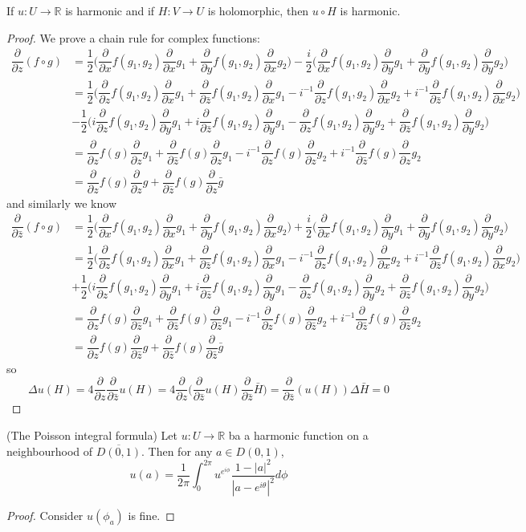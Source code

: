 \documentclass[lang=en, color=blue, ]{elegantbook}
\newcommand{\R}{\mathbb{R}}
\newcommand{\ParZ}{\dfrac{\partial}{\partial z}}
\newcommand{\ParbZ}{\dfrac{\partial}{\partial \bar{z}}}
\newcommand{\ParX}{\dfrac{\partial}{\partial x}}
\newcommand{\ParY}{\dfrac{\partial}{\partial y}}
\begin{document}
\begin{lemma}
    If $u:U\to\R$ is harmonic and if $H:V\to U$ is holomorphic, then $u\circ H$ is harmonic.
\end{lemma}
\begin{proof}
    We prove a chain rule for complex functions:
    \[
    \begin{aligned}
    \ParZ(f\circ g) &= \dfrac{1}{2}\Big(\ParX f(g_1,g_2)\ParX g_1+\ParY f(g_1,g_2)\ParX g_2\Big)-\dfrac{i}{2}\Big(\ParX f(g_1,g_2)\ParY g_1+\ParY f(g_1,g_2)\ParY g_2\Big) \\
    &= \dfrac{1}{2}\Big( \ParZ f(g_1,g_2)\ParX g_1+\ParbZ f(g_1,g_2)\ParX g_1-i^{-1}\ParZ f(g_1,g_2)\ParX g_2+i^{-1}\ParbZ f(g_1,g_2)\ParX g_2\Big)
    \\ & - \dfrac{1}{2}\Big( i\ParZ f(g_1,g_2)\ParY g_1+i\ParbZ f(g_1,g_2)\ParY g_1-\ParZ f(g_1,g_2)\ParY g_2+\ParbZ f(g_1,g_2)\ParY g_2\Big)
    \\& = \ParZ f(g)\ParZ g_1+\ParbZ f(g)\ParZ g_1 -i^{-1}\ParZ f(g)\ParZ g_2 + i^{-1}\ParbZ f(g)\ParZ g_2
    \\& = \ParZ f(g)\ParZ {g} + \ParbZ f(g)\ParZ \bar{g}
    \end{aligned}
    \]
    and similarly we know
    \[
    \begin{aligned}
    \ParbZ(f\circ g) &= \dfrac{1}{2}\Big(\ParX f(g_1,g_2)\ParX g_1+\ParY f(g_1,g_2)\ParX g_2\Big)+\dfrac{i}{2}\Big(\ParX f(g_1,g_2)\ParY g_1+\ParY f(g_1,g_2)\ParY g_2\Big) \\
    &= \dfrac{1}{2}\Big( \ParZ f(g_1,g_2)\ParX g_1+\ParbZ f(g_1,g_2)\ParX g_1-i^{-1}\ParZ f(g_1,g_2)\ParX g_2+i^{-1}\ParbZ f(g_1,g_2)\ParX g_2\Big)
    \\ & + \dfrac{1}{2}\Big( i\ParZ f(g_1,g_2)\ParY g_1+i\ParbZ f(g_1,g_2)\ParY g_1-\ParZ f(g_1,g_2)\ParY g_2+\ParbZ f(g_1,g_2)\ParY g_2\Big)
    \\& = \ParZ f(g)\ParbZ g_1+\ParbZ f(g)\ParbZ g_1 -i^{-1}\ParZ f(g)\ParbZ g_2 + i^{-1}\ParbZ f(g)\ParbZ g_2
    \\& = \ParZ f(g)\ParbZ {g} + \ParbZ f(g)\ParbZ \bar{g}
    \end{aligned}
    \]
    so
    \[
    \Delta u(H) = 4\ParZ\ParbZ u(H) = 4\ParZ\Big(\ParbZ u(H)\ParbZ \bar{H}\Big) = \ParbZ(u(H))\Delta \bar{H} = 0
    \]
\end{proof}

\begin{theorem}
    (The Poisson integral formula) Let $u:U\to\R$ ba a harmonic function on a neighbourhood of $\overline{D(0,1)}$. Then for any $a\in D(0,1)$,
    \[u(a) = \dfrac{1}{2\pi}\int_0^{2\pi} u^{e^{i\phi}}\dfrac{1-|a|^2}{|a-e^{i\theta}|^2}d\phi\]
\end{theorem}
\begin{proof}
    Consider $u(\phi_a)$ is fine.
\end{proof}
\end{document}
